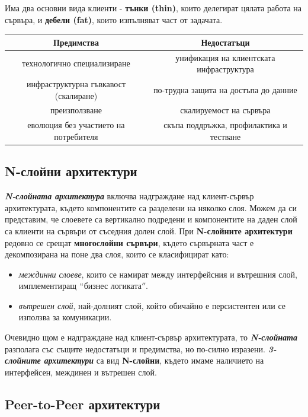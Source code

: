 \documentclass[fleqn,12pt]{article}
\begin{document}
Има два основни вида клиенти - \textbf{тънки (thin)}, които делегират цялата работа на сървъра, и \textbf{дебели (fat)}, които изпълняват част от задачата.
\bigbreak


\begin{center}
\begin{tabular}{ |c|c| } 
    \hline
    Предимства & Недостатъци \\
    \hline
    технологично специализиране & унификация на клиентската инфраструктура \\
    \hline
    инфраструктурна гъвкавост (скалиране) & по-трудна защита на достъпа до данние \\
    \hline
    преизползване & скалируемост на сървъра \\
    \hline
    еволюция без участието на потребителя & скъпа поддръжка, профилактика и тестване \\
    \hline
\end{tabular}
\end{center}

\subsection{N-слойни архитектури}

\textbf{\textit{N-слойната архитектура}} включва надграждане над клиент-сървър архитектурата, където компонентите са разделени на няколко слоя.
Можем да си представим, че слоевете са вертикално подредени и компонентите на даден слой са клиенти на сървъри от съседния долен слой.
\bigbreak
При \textbf{N-слойните архитектури} редовно се срещат \textbf{многослойни сървъри}, където сървърната част е декомпозирана на поне два слоя, които се класифицират като:
\begin{itemize}
    \item \textit{междинни слоеве}, които се намират между интерфейсния и вътрешния слой, имплементиращ $``$бизнес логиката$''$.
    \item \textit{вътрешен слой}, най-долният слой, който обичайно е персистентен или се използва за комуникации. 
\end{itemize}

Очевидно щом е надграждане над клиент-сървър архитектурата, то \textbf{\textit{N-слойната}} разполага със същите недостатъци и предимства, но по-силно изразени.
\bigbreak
\textbf{\textit{3-слойните архитектури}} са вид \textbf{N-слойни}, където имаме наличието на интерфейсен, междинен и вътрешен слой.

\subsection{Peer-to-Peer архитектури}
\end{document}
